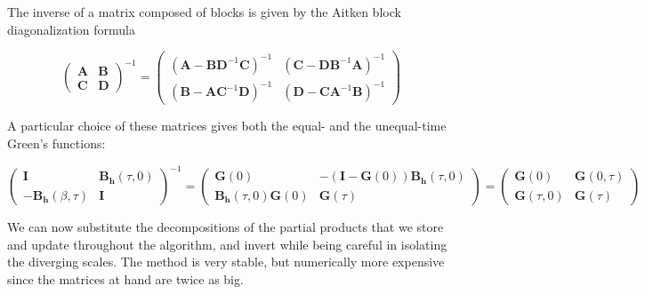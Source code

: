 The inverse of a matrix composed of blocks is given by the Aitken block diagonalization formula

\begin{equation}
\begin{pmatrix}
\bm A & \bm B \\
\bm C & \bm D
\end{pmatrix}^{-1}
=
\begin{pmatrix}
( \bm A - \bm B \bm D^{-1} \bm C )^{-1} & ( \bm C - \bm D \bm B^{-1} \bm A )^{-1} \\
( \bm B - \bm A \bm C^{-1} \bm D )^{-1} & ( \bm D - \bm C \bm A^{-1} \bm B )^{-1}
\end{pmatrix}
\end{equation}

A particular choice of these matrices gives both the equal- and the unequal-time Green's functions:

\begin{equation}
\begin{pmatrix}
\bm I & \bm B_{\bm h} (\tau, 0) \\
-\bm B_{\bm h} ( \beta, \tau ) & \bm I
\end{pmatrix}^{-1}
=
\begin{pmatrix}
\bm G ( 0 ) & - ( \bm I - \bm G ( 0 ) ) \bm B_{\bm h} ( \tau, 0 )  \\
\bm B_{\bm h} ( \tau, 0 ) \bm G ( 0 ) & \bm G ( \tau ) 
\end{pmatrix}
=
\begin{pmatrix}
\bm G ( 0 ) & \bm G ( 0, \tau )  \\
\bm G ( \tau, 0 ) & \bm G ( \tau ) 
\end{pmatrix}
\end{equation}

We can now substitute the decompositions of the partial products that we store and update throughout the algorithm, and invert while being careful in isolating the diverging scales.
The method is very stable, but numerically more expensive since the matrices at hand are twice as big.

